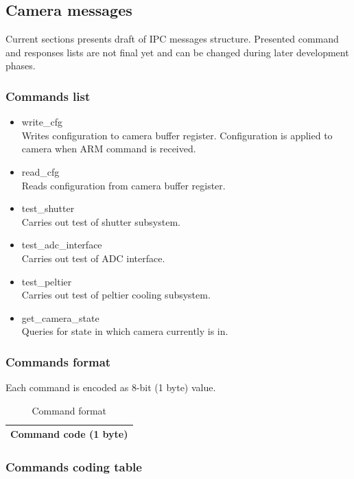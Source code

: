 \subsection{Camera messages}
Current sections presents draft of IPC messages structure. Presented command and responses lists are not final yet and can be changed during later development phases.

\subsubsection{Commands list}

\begin{itemize}
\item write\_cfg \hfill \\
Writes configuration to camera buffer register. Configuration is applied to camera when ARM command is received.
\item read\_cfg \hfill \\ 
Reads configuration from camera buffer register.
\item test\_shutter \hfill \\ 
Carries out test of shutter subsystem.
\item test\_adc\_interface \hfill \\
Carries out test of ADC interface.
\item test\_peltier \hfill \\
Carries out test of peltier cooling subsystem.
\item get\_camera\_state \hfill \\
Queries for state in which camera currently is in.
\end{itemize}

\subsubsection{Commands format}
Each command is encoded as 8-bit (1 byte) value.

\begin{table}[H]
\begin{center}
    \begin{tabular}{ | l |}
    \hline
    Command code (1 byte)\\ \hline
    \end{tabular}
    \end{center}
    \caption{Command format}
	\label{table:command_format}
\end{table}

\subsubsection{Commands coding table}

